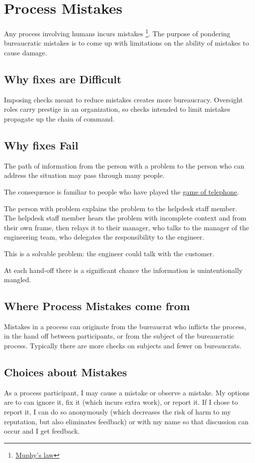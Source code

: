\section{Process Mistakes\label{sec:process-mistakes}}

Any process involving humans incurs mistakes  
\footnote{\href{https://en.wikipedia.org/wiki/Murphy\%27s_law}{Muphy's law}}. 
The purpose of pondering bureaucratic mistakes is to come up with limitations on the ability of mistakes to cause damage. 

\subsection*{Why fixes are Difficult}
Imposing checks meant to reduce mistakes creates more bureaucracy. Oversight roles carry prestige in an organization, so checks intended to limit mistakes propagate up the chain of command.


\subsection*{Why fixes Fail}
The path of information from the person with a problem to the person who can address the situation may pass through many people. 

The consequence is familiar to people who have played the \href{https://en.wikipedia.org/wiki/Chinese_whispers\%23Game}{game of telephone}.
\begin{mdframed}
The person with problem explains the problem to the helpdesk staff member. The helpdesk staff member hears the problem with incomplete context and from their own frame, then relays it to their manager, who talks to the manager of the engineering team, who delegates the responsibility to the engineer. 
\end{mdframed}
This is a solvable problem: the engineer could talk with the customer. 

At each hand-off there is a significant chance the information is unintentionally mangled. 

\subsection*{Where Process Mistakes come from}
Mistakes in a process can originate from the bureaucrat who inflicts the process, in the hand off between participants, or from the \gls{subject} of the bureaucratic process. Typically there are more checks on subjects and fewer on bureaucrats. 

\subsection*{Choices about Mistakes}
As a process participant, I may cause a mistake or observe a mistake. My options are to can ignore it, fix it (which incurs extra work), or report it. If I chose to report it, I can do so anonymously (which decreases the risk of harm to my reputation, but also eliminates feedback) or with my name so that discussion can occur and I get feedback.